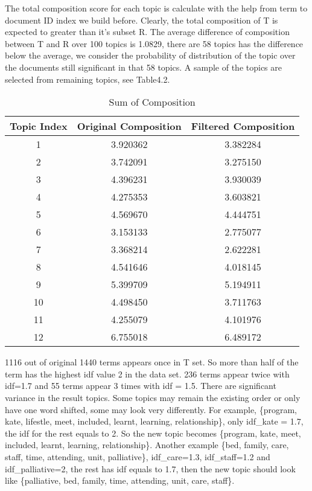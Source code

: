 \documentclass[11pt,twoside]{report}
\begin{document}
The total composition score for each topic is calculate with the help from term to document ID index we build before. 
Clearly, the total composition of T is expected to greater than it's subset R. The average difference of composition between T and R over 100 topics is 1.0829, there are 58 topics has the difference below the average, we consider the probability of distribution of the topic over the documents still significant in that 58 topics. A sample of the topics are selected from remaining topics, see Table4.2. 
\begin{table}[h]
\caption{Sum of Composition}
\centering
\begin{tabular}{c c c}
\hline\hline
Topic Index & Original Composition & Filtered Composition\\
\hline
1 & 3.920362 & 3.382284\\
2 & 3.742091 & 3.275150\\
3 & 4.396231 & 3.930039\\
4 & 4.275353 & 3.603821\\
5 & 4.569670 & 4.444751\\
6 & 3.153133 & 2.775077\\
7 & 3.368214 & 2.622281\\
8 & 4.541646 & 4.018145\\
9 & 5.399709 & 5.194911\\
10 & 4.498450 & 3.711763\\
11 & 4.255079 & 4.101976\\
12 & 6.755018 & 6.489172\\
\hline
\end{tabular}
\label{table:Topic Composition}
\end{table}

1116 out of original 1440 terms appears once in T set. So more than half of the term has the highest idf value 2 in the data set. 236 terms appear twice with idf=1.7 and 55 terms appear 3 times with idf = 1.5. There are significant variance in the result topics. Some topics may remain the existing order or only have one word shifted, some may look very differently.  For example, \{program, kate, lifestle, meet, included, learnt, learning, relationship\}, only idf_{kate} = 1.7, the idf for the rest equals to 2. So the new topic becomes \{program, kate, meet, included, learnt, learning, relationship\}. Another example \{bed, family, care, staff, time, attending, unit, palliative\}, idf_{care}=1.3, idf_{staff}=1.2 and idf_{palliative}=2, the rest has idf equals to 1.7, then the new topic should look like \{palliative, bed, family, time, attending, unit, care, staff\}. 
\end{document}
